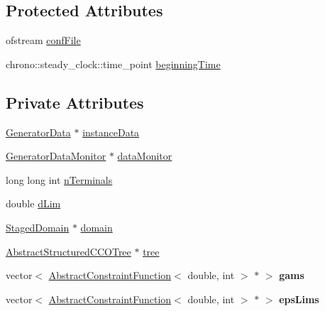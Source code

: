 \subsection*{Protected Attributes}
\begin{DoxyCompactItemize}
\item 
ofstream \hyperlink{class_staged_f_r_r_s_tree_generator_a764313586a157f7194ae945e76024e1f}{conf\+File}
\item 
chrono\+::steady\+\_\+clock\+::time\+\_\+point \hyperlink{class_staged_f_r_r_s_tree_generator_ae3f8c8407c40b6fac229574fcc8106d4}{beginning\+Time}
\end{DoxyCompactItemize}
\subsection*{Private Attributes}
\begin{DoxyCompactItemize}
\item 
\hyperlink{class_generator_data}{Generator\+Data} $\ast$ \hyperlink{class_staged_f_r_r_s_tree_generator_a8df19e56e9037a0f012cbaa6beb171ca}{instance\+Data}
\item 
\hyperlink{class_generator_data_monitor}{Generator\+Data\+Monitor} $\ast$ \hyperlink{class_staged_f_r_r_s_tree_generator_ad408787a8ec7350e68f00924ad6e8075}{data\+Monitor}
\item 
long long int \hyperlink{class_staged_f_r_r_s_tree_generator_a9ac1eafca6caa14601df23da77cfa565}{n\+Terminals}
\item 
double \hyperlink{class_staged_f_r_r_s_tree_generator_add278e195be9de240c8460e6480f0a44}{d\+Lim}
\item 
\hyperlink{class_staged_domain}{Staged\+Domain} $\ast$ \hyperlink{class_staged_f_r_r_s_tree_generator_adc8ddbcf948810b70a7f9b59237a36e2}{domain}
\item 
\hyperlink{class_abstract_structured_c_c_o_tree}{Abstract\+Structured\+C\+C\+O\+Tree} $\ast$ \hyperlink{class_staged_f_r_r_s_tree_generator_a584a1e0e109ac6bdeae996178f8d8646}{tree}
\item 
vector$<$ \hyperlink{class_abstract_constraint_function}{Abstract\+Constraint\+Function}$<$ double, int $>$ $\ast$ $>$ {\bfseries gams}\hypertarget{class_staged_f_r_r_s_tree_generator_a24e70672271f24d8a45d0a055202cb92}{}\label{class_staged_f_r_r_s_tree_generator_a24e70672271f24d8a45d0a055202cb92}

\item 
vector$<$ \hyperlink{class_abstract_constraint_function}{Abstract\+Constraint\+Function}$<$ double, int $>$ $\ast$ $>$ {\bfseries eps\+Lims}\hypertarget{class_staged_f_r_r_s_tree_generator_a40bf32899a1b6348a8808c8179074785}{}\label{class_staged_f_r_r_s_tree_generator_a40bf32899a1b6348a8808c8179074785}


\end{DoxyCompactItemize}
